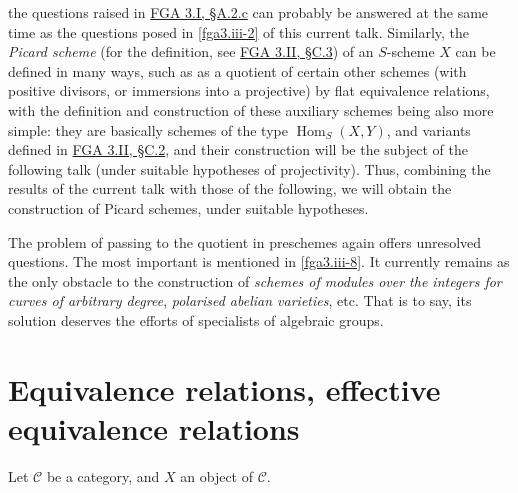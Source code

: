   the questions raised in \hyperref[fga3.i-a.2.c]{FGA 3.I, §A.2.c} can probably be answered at the same time as the questions posed in \cref{fga3.iii-2} of this current talk.
  Similarly, the \emph{Picard scheme} (for the definition, see \hyperref[fga3.ii-c.3]{FGA 3.II, §C.3}) of an \(S\)-scheme \(X\) can be defined in many ways, such as as a quotient of certain other schemes (with positive divisors, or immersions into a projective) by flat equivalence relations, with the definition and construction of these auxiliary schemes being also more simple: they are basically schemes of the type \(\operatorname {Hom}_S(X,Y)\), and variants defined in \hyperref[fga3.ii-c.2]{FGA 3.II, §C.2}, and their construction will be the subject of the following talk (under suitable hypotheses of projectivity).
  Thus, combining the results of the current talk with those of the following, we will obtain the construction of Picard schemes, under suitable hypotheses.\par{}The problem of passing to the quotient in preschemes again offers unresolved questions.
  The most important is mentioned in \cref{fga3.iii-8}.
  It currently remains as the only obstacle to the construction of \emph{schemes of modules over the integers for curves of arbitrary degree}, \emph{polarised abelian varieties}, etc.
  That is to say, its solution deserves the efforts of specialists of algebraic groups.\chapter{Equivalence relations, effective equivalence relations}\thispagestyle{fancy}\label{fga3.iii-1}\par{}Let \(\mathcal {C}\) be a category, and \(X\) an object of \(\mathcal {C}\).
  
